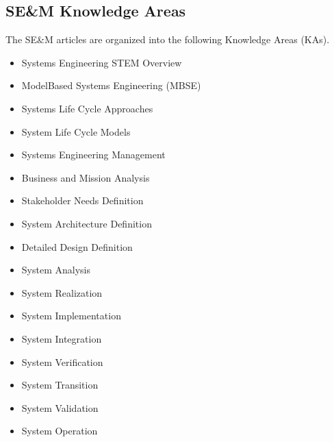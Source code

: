 \documentclass[letterpaper,10pt,english]{jupyterBook}
\begin{document}
\subsection{SE\&M Knowledge Areas}
\label{\detokenize{SE/sebok:se-m-knowledge-areas}}
\sphinxAtStartPar
The SE\&M articles are organized into the following Knowledge Areas (KAs).
\begin{itemize}
\item {} 
\sphinxAtStartPar
Systems Engineering STEM Overview

\item {} 
\sphinxAtStartPar
Model\sphinxhyphen{}Based Systems Engineering (MBSE)

\item {} 
\sphinxAtStartPar
Systems Life Cycle Approaches

\item {} 
\sphinxAtStartPar
System Life Cycle Models

\item {} 
\sphinxAtStartPar
Systems Engineering Management

\item {} 
\sphinxAtStartPar
Business and Mission Analysis

\item {} 
\sphinxAtStartPar
Stakeholder Needs Definition

\item {} 
\sphinxAtStartPar
System Architecture Definition

\item {} 
\sphinxAtStartPar
Detailed Design Definition

\item {} 
\sphinxAtStartPar
System Analysis

\item {} 
\sphinxAtStartPar
System Realization

\item {} 
\sphinxAtStartPar
System Implementation

\item {} 
\sphinxAtStartPar
System Integration

\item {} 
\sphinxAtStartPar
System Verification

\item {} 
\sphinxAtStartPar
System Transition

\item {} 
\sphinxAtStartPar
System Validation

\item {} 
\sphinxAtStartPar
System Operation


\end{itemize}
\end{document}
